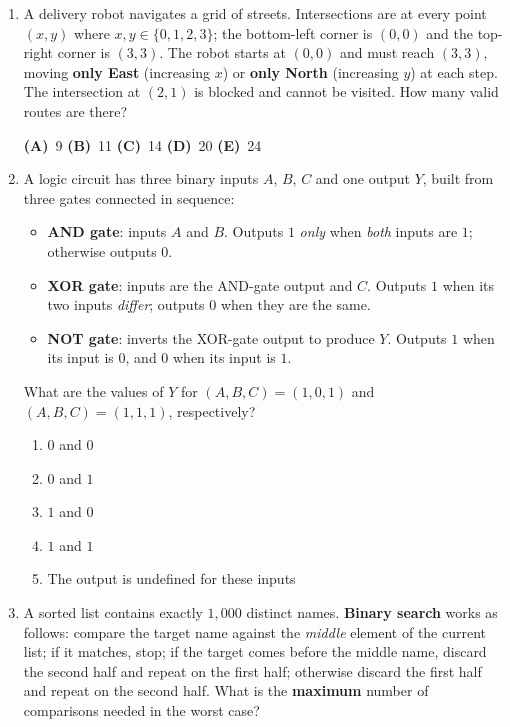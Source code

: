 \documentclass[a4paper,12pt]{article}
\newcommand{\hchoices}[5]{%
  \par\vspace{5pt}%
  \noindent\hspace{2em}%
  \textbf{(A)}~#1\hfill%
  \textbf{(B)}~#2\hfill%
  \textbf{(C)}~#3\hfill%
  \textbf{(D)}~#4\hfill%
  \textbf{(E)}~#5\par%
  \vspace{4pt}%
}
\newenvironment{choices}{%
  \begin{enumerate}[label=\textbf{(\Alph*)},
                    leftmargin=2.5em,
                    itemsep=2pt,
                    topsep=4pt,
                    parsep=0pt]%
}{%
  \end{enumerate}%
}
\begin{document}
\begin{enumerate}[label=\textbf{Q\arabic*.},
                  itemsep=3.5ex,
                  leftmargin=3.8em,
                  parsep=0pt]

\item A delivery robot navigates a grid of streets. Intersections are at every
point $(x,y)$ where $x, y \in \{0, 1, 2, 3\}$; the bottom-left corner is
$(0,0)$ and the top-right corner is $(3,3)$. The robot starts at $(0,0)$ and
must reach $(3,3)$, moving \textbf{only East} (increasing $x$) or \textbf{only
North} (increasing $y$) at each step. The intersection at $(2,1)$ is blocked
and cannot be visited. How many valid routes are there?

\hchoices{9}{11}{14}{20}{24}

\item A logic circuit has three binary inputs $A$, $B$, $C$ and one output
$Y$, built from three gates connected in sequence:

\begin{itemize}[nosep, leftmargin=2em, topsep=2pt]
  \item \textbf{AND gate}: inputs $A$ and $B$.
        Outputs $1$ \emph{only} when \emph{both} inputs are $1$; otherwise outputs $0$.
  \item \textbf{XOR gate}: inputs are the AND-gate output and $C$.
        Outputs $1$ when its two inputs \emph{differ}; outputs $0$ when they are the same.
  \item \textbf{NOT gate}: inverts the XOR-gate output to produce $Y$.
        Outputs $1$ when its input is $0$, and $0$ when its input is $1$.
\end{itemize}

What are the values of $Y$ for $(A,B,C)=(1,0,1)$ and $(A,B,C)=(1,1,1)$,
respectively?

\begin{choices}
  \item $0$ and $0$
  \item $0$ and $1$
  \item $1$ and $0$
  \item $1$ and $1$
  \item The output is undefined for these inputs
\end{choices}

\item A sorted list contains exactly $1{,}000$ distinct names.
\textbf{Binary search} works as follows: compare the target name against the
\emph{middle} element of the current list; if it matches, stop; if the target
comes before the middle name, discard the second half and repeat on the first
half; otherwise discard the first half and repeat on the second half.
What is the \textbf{maximum} number of comparisons needed in the worst case?


\end{enumerate}
\end{document}
